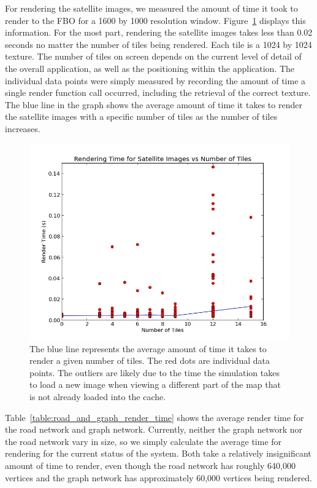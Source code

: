 For rendering the satellite images, we measured the amount of time it took to render to the FBO for a 1600 by 1000 resolution window\@. Figure~\ref{fig:satellite_graph} displays this information.  For the most part, rendering the satellite images takes less than 0.02 seconds no matter the number of tiles being rendered. Each tile is a 1024 by 1024 texture. The number of tiles on screen depends on the current level of detail of the overall application, as well as the positioning
within the application. The individual data points were simply measured by recording the amount of time a single render function call occurred, including the retrieval of the correct texture. The blue line in the graph shows the average amount of time it takes to render the satellite images with a specific number of tiles as the number of tiles increases.

\begin{figure}[htp]\centering
    \includegraphics[width=0.80\linewidth]{img/satellite_render_graph.jpg}
    \caption[Satellite Image Render Time Graph]{The blue line represents the average amount of time it takes to render a given number of tiles. The red dots are individual data points. The outliers are likely due to the time the simulation takes to load a new image when viewing a different part of the map that is not already loaded into the cache.}
    \label{fig:satellite_graph}
\end{figure}

Table~\ref{table:road_and_graph_render_time} shows the average render time for the road network and graph network. Currently, neither the graph network nor the road network vary in size, so we simply calculate the average time for rendering for the current status of the system. Both take a relatively insignificant amount of time to render, even though the road network has roughly 640,000 vertices and the graph network has approximately 60,000 vertices being rendered.

